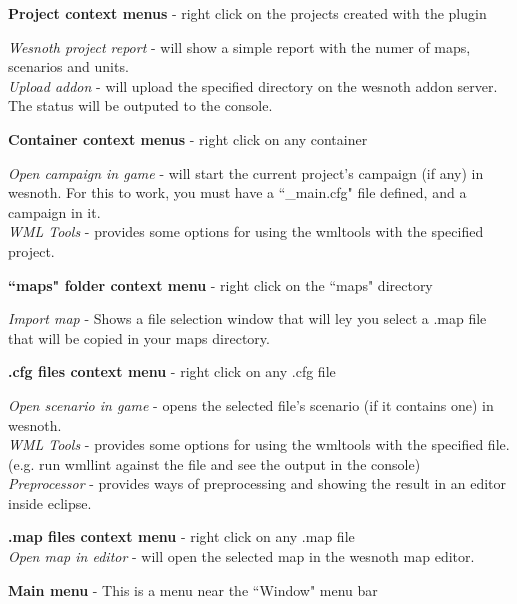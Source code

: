 \documentclass[10pt]{article}
\begin{document}
\begin{description}
\item{\textbf{Project context menus}} - right click on the projects created with the plugin

   \textit{Wesnoth project report} - will show a simple report with the numer of maps, scenarios and units.\\
   \textit{Upload addon} - will upload the specified directory on the wesnoth addon server. The status will be outputed to the console.

\item{\textbf{Container context menus}} - right click on any container

   \textit{Open campaign in game} - will start the current project's campaign (if any) in wesnoth. For this to work, you must have a ``\_main.cfg" file defined, and a campaign in it.\\
    \textit{WML Tools} - provides some options for using the wmltools with the specified project.

\item{\textbf{``maps" folder context menu}} - right click on the ``maps" directory

   \textit{Import map} - Shows a file selection window that will ley you select a .map file that will be copied in your maps directory.

\item{\textbf{.cfg files context menu}} - right click on any .cfg file

   \textit{Open scenario in game} - opens the selected file's scenario (if it contains one) in wesnoth.\\
   \textit{WML Tools} - provides some options for using the wmltools with the specified file. (e.g. run wmllint against the file and see the output in the console) \\
   \textit{Preprocessor} - provides ways of preprocessing and showing the result in an editor inside eclipse.

\item{\textbf{.map files context menu}} - right click on any .map file\\

   \textit{Open map in editor} - will open the selected map in the wesnoth map editor.

\item{\textbf{Main menu}} - This is a menu near the ``Window" menu bar


\end{description}
\end{document}
